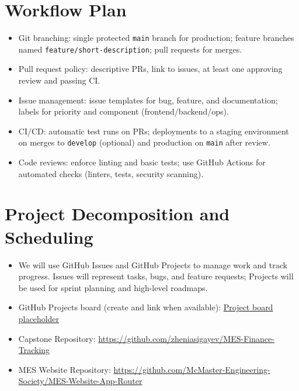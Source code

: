 \documentclass{article}
\begin{document}

\section{Workflow Plan}

\begin{itemize}
  \item Git branching: single protected \texttt{main} branch for production; feature branches named \texttt{feature/short-description}; pull requests for merges.
  \item Pull request policy: descriptive PRs, link to issues, at least one approving review and passing CI.
  \item Issue management: issue templates for bug, feature, and documentation; labels for priority and component (frontend/backend/ops).
  \item CI/CD: automatic test runs on PRs; deployments to a staging environment on merges to \texttt{develop} (optional) and production on \texttt{main} after review.
  \item Code reviews: enforce linting and basic tests; use GitHub Actions for automated checks (linters, tests, security scanning).
\end{itemize}

\section{Project Decomposition and Scheduling}

\begin{itemize}
  \item We will use GitHub Issues and GitHub Projects to manage work and track progress. Issues will represent tasks, bugs, and feature requests; Projects will be used for sprint planning and high-level roadmaps.
  \item GitHub Projects board (create and link when available): \href{https://github.com/zheniasigayev/MES-Finance-Tracking/projects}{Project board placeholder}
  \item Capstone Repository: \href{https://github.com/zheniasigayev/MES-Finance-Tracking}{https://github.com/zheniasigayev/MES-Finance-Tracking}
  \item MES Website Repository: \href{https://github.com/McMaster-Engineering-Society/MES-Website-App-Router}{https://github.com/McMaster-Engineering-Society/MES-Website-App-Router}
\end{itemize}
\end{document}
